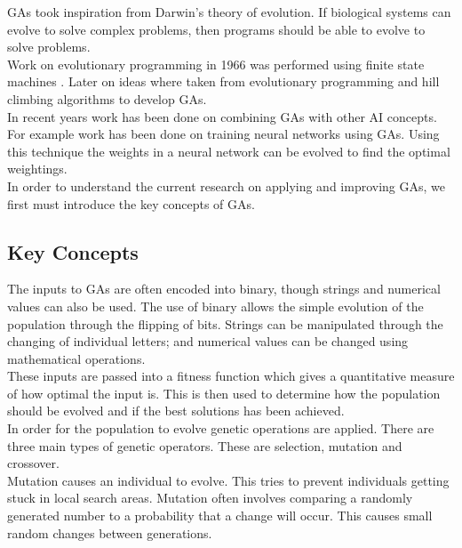 \documentclass[10pt,a4paper,openbib]{article}
\begin{document}
\begin{multicols}{2}
\noindent GAs took inspiration from Darwin's theory of evolution. If biological systems can evolve to solve complex problems, then programs should be able to evolve to solve problems. \\

\noindent Work on evolutionary programming in 1966 was performed using finite state machines \cite{MitchellBook}. Later on ideas where taken from evolutionary programming and hill climbing algorithms to develop GAs. \\

\noindent In recent years work has been done on combining GAs with other AI concepts. For example work has been done on training neural networks using GAs. Using this technique the weights in a neural network can be evolved to find the optimal weightings. \cite{montana1989training} \\

\noindent In order to understand the current research on applying and improving GAs, we first must introduce the key concepts of GAs.

\subsection{Key Concepts} \label{key_concepts}
The inputs to GAs are often encoded into binary, though strings and numerical values can also be used. The use of binary allows the simple evolution of the population through the flipping of bits. Strings can be manipulated through the changing of individual letters; and numerical values can be changed using mathematical operations. \cite{geneticsWebsite}\\

\noindent These inputs are passed into a fitness function which gives a quantitative measure of how optimal the input is. This is then used to determine how the population should be evolved and if the best solutions has been achieved. \\

\noindent In order for the population to evolve genetic operations are applied. There are three main types of genetic operators. These are selection, mutation and crossover. \\

\noindent Mutation causes an individual to evolve. This tries to prevent individuals getting stuck in local search areas. Mutation often involves comparing a randomly generated number to a probability that a change will occur. This causes small random changes between generations. \cite{nearestPoint}   \\ 


\end{multicols}
\end{document}

